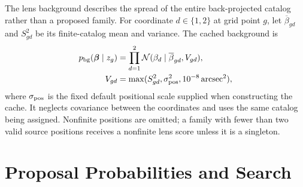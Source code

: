\documentclass[twocolumn,twocolappendix,linenumbers]{aastex701}
\newcommand{\N}{\mathcal{N}}
\newcommand{\bg}{\mathrm{bg}}
\begin{document}
The lens background describes the spread of the entire back-projected catalog rather than a proposed family.
For coordinate $d\in\{1,2\}$ at grid point $g$, let $\overline\beta_{gd}$ and $S_{gd}^2$ be its finite-catalog mean and variance.
The cached background is
\begin{equation}
 \begin{aligned}
 p_{\bg}(\boldsymbol{\beta}\mid z_g)
 &=\prod_{d=1}^{2}\N(\beta_d\mid\overline\beta_{gd},V_{gd}),\\
 V_{gd}&=\max(S_{gd}^2,\sigma_{\rm pos}^2,
                          10^{-8}\,\mathrm{arcsec}^2),
 \end{aligned}
 \label{eq:lensbackground}
\end{equation}
where $\sigma_{\rm pos}$ is the fixed default positional scale supplied when constructing the cache.
It neglects covariance between the coordinates and uses the same catalog being assigned.
Nonfinite positions are omitted; a family with fewer than two valid source positions receives a nonfinite lens score unless it is a singleton.

\section{Proposal Probabilities and Search}
\label{app:proposals}
\end{document}
